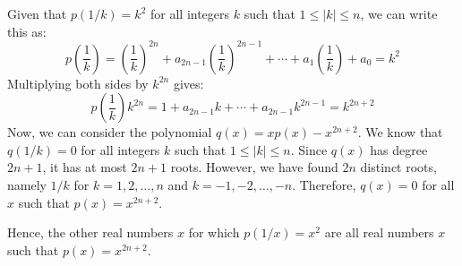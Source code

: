 Given that \( p(1/k) = k^2 \) for all integers \( k \) such that \( 1 \leq |k| \leq n \), we can write this as:
\[ p\left(\frac{1}{k}\right) = \left(\frac{1}{k}\right)^{2n} + a_{2n-1} \left(\frac{1}{k}\right)^{2n-1} + \cdots + a_1 \left(\frac{1}{k}\right) + a_0 = k^2 \]
Multiplying both sides by \( k^{2n} \) gives:
\[ p\left(\frac{1}{k}\right)k^{2n} = 1 + a_{2n-1} k + \cdots + a_{2n-1} k^{2n-1} = k^{2n+2} \]
Now, we can consider the polynomial \( q(x) = xp(x) - x^{2n+2} \). We know that \( q(1/k) = 0 \) for all integers \( k \) such that \( 1 \leq |k| \leq n \). Since \( q(x) \) has degree \( 2n+1 \), it has at most \( 2n+1 \) roots. However, we have found \( 2n \) distinct roots, namely \( 1/k \) for \( k = 1, 2, \ldots, n \) and \( k = -1, -2, \ldots, -n \). Therefore, \( q(x) = 0 \) for all \( x \) such that \( p(x) = x^{2n+2} \).

Hence, the other real numbers \( x \) for which \( p(1/x) = x^2 \) are all real numbers \( x \) such that \( p(x) = x^{2n+2} \).
